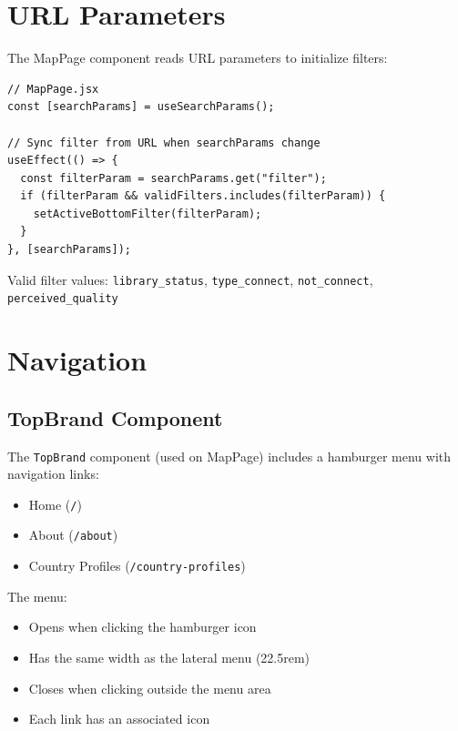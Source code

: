 \documentclass[11pt,a4paper]{article}
\begin{document}
\section{URL Parameters}

The MapPage component reads URL parameters to initialize filters:

\begin{lstlisting}
// MapPage.jsx
const [searchParams] = useSearchParams();

// Sync filter from URL when searchParams change
useEffect(() => {
  const filterParam = searchParams.get("filter");
  if (filterParam && validFilters.includes(filterParam)) {
    setActiveBottomFilter(filterParam);
  }
}, [searchParams]);
\end{lstlisting}

Valid filter values: \texttt{library\_status}, \texttt{type\_connect}, \texttt{not\_connect}, \texttt{perceived\_quality}

\section{Navigation}

\subsection{TopBrand Component}

The \texttt{TopBrand} component (used on MapPage) includes a hamburger menu with navigation links:

\begin{itemize}
  \item Home (\texttt{/})
  \item About (\texttt{/about})
  \item Country Profiles (\texttt{/country-profiles})
\end{itemize}

The menu:
\begin{itemize}
  \item Opens when clicking the hamburger icon
  \item Has the same width as the lateral menu (22.5rem)
  \item Closes when clicking outside the menu area
  \item Each link has an associated icon
\end{itemize}
\end{document}
